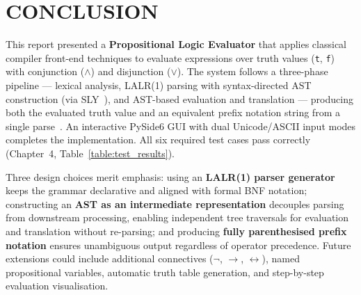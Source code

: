\chapter{CONCLUSION}

This report presented a \textbf{Propositional Logic Evaluator} that applies classical compiler front-end techniques to evaluate expressions over truth values (\texttt{t}, \texttt{f}) with conjunction ($\wedge$) and disjunction ($\vee$). The system follows a three-phase pipeline --- lexical analysis, LALR(1) parsing with syntax-directed AST construction (via SLY~\citep{beazley2023sly}), and AST-based evaluation and translation --- producing both the evaluated truth value and an equivalent prefix notation string from a single parse~\citep{aho2006compilers}. An interactive PySide6 GUI with dual Unicode/ASCII input modes completes the implementation. All six required test cases pass correctly (Chapter~4, Table~\ref{table:test_results}).

Three design choices merit emphasis: using an \textbf{LALR(1) parser generator} keeps the grammar declarative and aligned with formal BNF notation; constructing an \textbf{AST as an intermediate representation} decouples parsing from downstream processing, enabling independent tree traversals for evaluation and translation without re-parsing; and producing \textbf{fully parenthesised prefix notation} ensures unambiguous output regardless of operator precedence. Future extensions could include additional connectives ($\neg$, $\rightarrow$, $\leftrightarrow$), named propositional variables, automatic truth table generation, and step-by-step evaluation visualisation.
